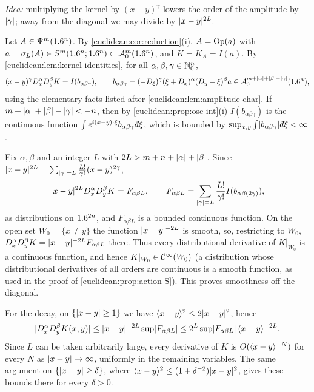 \emph{Idea:} multiplying the kernel by $(x-y)^\gamma$ lowers the order of the amplitude by
$\lvert \gamma\rvert$; away from the diagonal we may divide by $\lvert x-y\rvert^{2L}$.

Let $A\in\Psi^{m}(1.6^n)$. By \cref{euclidean:cor:reduction}(i), $A=\operatorname{Op}(a)$ with
$a=\sigma_L(A)\in S^m(1.6^n;1.6^n)\subset\mathcal{A}^{m}_{0}(1.6^n)$, and $K=K_A=I(a)$. By
\cref{euclidean:lem:kernel-identities}, for all $\alpha,\beta,\gamma\in\mathbb{N}_0^n$,
\begin{equation*}
  (x-y)^\gamma D^\alpha_xD^\beta_yK=I(b_{\alpha\beta\gamma}),\qquad
  b_{\alpha\beta\gamma}=(-D_\xi)^\gamma(\xi+D_x)^\alpha(D_y-\xi)^\beta a
  \in\mathcal{A}^{m+\lvert \alpha\rvert+\lvert \beta\rvert-\lvert \gamma\rvert}_{0}(1.6^n),
\end{equation*}
using the elementary facts listed after \cref{euclidean:lem:amplitude-char}. If
$m+\lvert \alpha\rvert+\lvert \beta\rvert-\lvert \gamma\rvert<-n$, then by \cref{euclidean:prop:osc-int}(i)
$I(b_{\alpha\beta\gamma})$ is the continuous function
$\int e^{i(x-y)\cdot\xi}b_{\alpha\beta\gamma}\,\dbar\xi$, which is bounded by
$\sup_{x,y}\int\abs{b_{\alpha\beta\gamma}}\,\dbar\xi<\infty$.

Fix $\alpha,\beta$ and an integer $L$ with $2L>m+n+\lvert \alpha\rvert+\lvert \beta\rvert$. Since
$\lvert x-y\rvert^{2L}=\sum_{\lvert \gamma\rvert=L}\frac{L!}{\gamma!}(x-y)^{2\gamma}$,
\begin{equation*}
  \lvert x-y\rvert^{2L}D^\alpha_xD^\beta_yK=F_{\alpha\beta L},\qquad
  F_{\alpha\beta L}=\sum_{\lvert \gamma\rvert=L}\frac{L!}{\gamma!}I(b_{\alpha\beta(2\gamma)}),
\end{equation*}
as distributions on $1.6^{2n}$, and $F_{\alpha\beta L}$ is a bounded continuous function.
On the open set $W_0=\{x\ne y\}$ the function $\lvert x-y\rvert^{-2L}$ is smooth, so,
restricting to $W_0$, $D^\alpha_xD^\beta_yK=\lvert x-y\rvert^{-2L}F_{\alpha\beta L}$ there.
Thus every distributional derivative of $K|_{W_0}$ is a continuous function, and hence
$K|_{W_0}\in\mathcal{C}^\infty(W_0)$ (a distribution whose distributional derivatives of all orders are
continuous is a smooth function, as used in the proof of
\cref{euclidean:prop:action-S}). This proves smoothness off the diagonal.

For the decay, on $\{\lvert x-y\rvert\ge1\}$ we have $\langle x-y\rangle^2\le2\lvert x-y\rvert^2$, hence
\begin{equation*}
  \lvert D^\alpha_xD^\beta_yK(x,y)\rvert\le\lvert x-y\rvert^{-2L}\sup\lvert F_{\alpha\beta L}\rvert
  \le2^L\sup\lvert F_{\alpha\beta L}\rvert\,\langle x-y\rangle^{-2L}.
\end{equation*}
Since $L$ can be taken arbitrarily large, every derivative of $K$ is
$O(\langle x-y\rangle^{-N})$ for every $N$ as $\lvert x-y\rvert\to\infty$, uniformly in the remaining
variables. The same argument on $\{\lvert x-y\rvert\ge\delta\}$, where
$\langle x-y\rangle^2\le(1+\delta^{-2})\lvert x-y\rvert^2$, gives these bounds there for every $\delta>0$.

